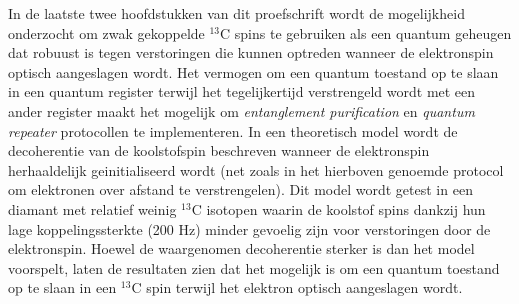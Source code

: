 In de laatste twee hoofdstukken van dit proefschrift wordt de mogelijkheid onderzocht om zwak gekoppelde $^{13}$C spins te gebruiken als een quantum geheugen dat robuust is tegen verstoringen die kunnen optreden wanneer de elektronspin optisch aangeslagen wordt. Het vermogen om een quantum toestand op te slaan in een quantum register terwijl het tegelijkertijd verstrengeld wordt met een ander register maakt het mogelijk om \textit{entanglement purification} en \textit{quantum repeater} protocollen te implementeren. In een theoretisch model wordt de decoherentie van de koolstofspin beschreven wanneer de elektronspin herhaaldelijk geinitialiseerd wordt (net zoals in het hierboven genoemde protocol om elektronen over afstand te verstrengelen). Dit model wordt getest in een diamant met relatief weinig $^{13}$C isotopen waarin de koolstof spins dankzij hun lage koppelingssterkte (200 Hz) minder gevoelig zijn voor verstoringen door de elektronspin. Hoewel de waargenomen decoherentie sterker is dan het model voorspelt, laten de resultaten zien dat het mogelijk is om een quantum toestand op te slaan in een $^{13}$C spin terwijl het elektron optisch aangeslagen wordt.


